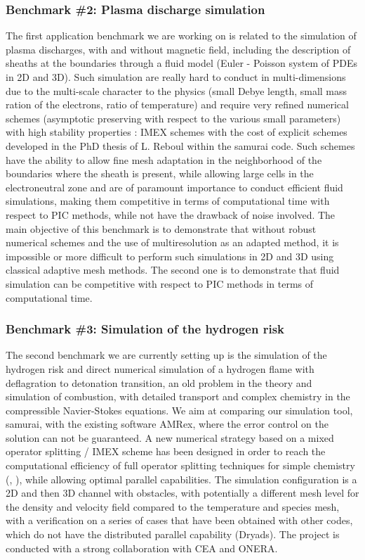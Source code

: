 \subsubsection{Benchmark \#2: Plasma discharge simulation}

The first application benchmark we are working on is related to the simulation of plasma discharges, with and without magnetic field, including the description of sheaths at the boundaries through a fluid model (Euler - Poisson system of PDEs in 2D and 3D). Such simulation are really hard to conduct in multi-dimensions due to the multi-scale character to the physics (small Debye length, small mass ration of the electrons, ratio of temperature) and require very refined numerical schemes (asymptotic preserving with respect to the various small parameters) with high stability properties : IMEX schemes with the cost of explicit schemes developed in the PhD thesis of L. Reboul within the samurai code. Such schemes have the ability to allow fine mesh adaptation in the neighborhood of the boundaries where the sheath is present, while allowing large cells in the electroneutral zone and are of paramount importance to conduct efficient fluid simulations, making them competitive in terms of computational time with respect to PIC methods, while not have the drawback of noise involved. The main objective of this benchmark is to demonstrate that without robust numerical schemes and the use of multiresolution as an adapted method, it is impossible or more difficult to perform such simulations in 2D and 3D using classical adaptive mesh methods. The second one is to demonstrate that fluid simulation can be competitive with respect to PIC methods in terms of computational time.

\subsubsection{Benchmark \#3: Simulation of the hydrogen risk}

The second benchmark we are currently setting up is the simulation of the hydrogen risk and direct numerical simulation of a hydrogen flame with deflagration to detonation transition, an old problem in the theory and simulation of combustion, with detailed transport and complex chemistry in the compressible Navier-Stokes equations. We aim at comparing our simulation tool, samurai, with the existing software AMRex, where the error control on the solution can not be guaranteed. A new numerical strategy based on a mixed operator splitting / IMEX scheme has been designed in order to reach the computational efficiency of full operator splitting techniques for simple chemistry (\cite{duarte_adaptive_2011}, \cite{lecointre_hydrogen_2022}), while allowing optimal parallel capabilities. The simulation configuration is a 2D and then 3D channel with obstacles, with potentially a different mesh level for the density and velocity field compared to the temperature and species mesh, with a verification on a series of cases that have been obtained with other codes, which do not have the distributed parallel capability (Dryads). The project is conducted with a strong collaboration with CEA and ONERA.

